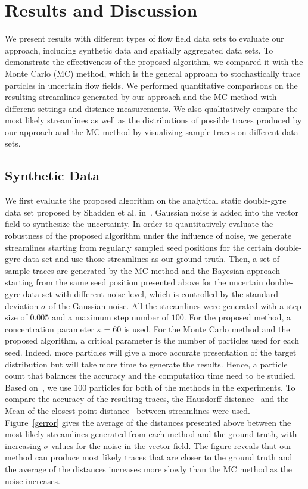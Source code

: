 \section{Results and Discussion}

We present results with different types of flow field data sets to evaluate our approach, including synthetic data and spatially aggregated data sets. To demonstrate the effectiveness of the proposed algorithm, we compared it with the Monte Carlo (MC) method, which is the general approach to stochastically trace particles in uncertain flow fields. We performed quantitative comparisons on the resulting streamlines generated by our approach and the MC method with different settings and distance measurements. We also qualitatively compare the most likely streamlines as well as the distributions of possible traces produced by our approach and the MC method by visualizing sample traces on different data sets.

\subsection{Synthetic Data}

We first evaluate the proposed algorithm on the analytical static double-gyre data set proposed by Shadden et al. in~\cite{Shadden2005271}. Gaussian noise is added into the vector field to synthesize the uncertainty. In order to quantitatively evaluate the robustness of the proposed algorithm under the influence of noise, we generate streamlines starting from regularly sampled seed positions for the certain double-gyre data set and use those streamlines as our ground truth. Then, a set of sample traces are generated by the MC method and the Bayesian approach starting from the same seed position presented above for the uncertain double-gyre data set with different noise level, which is controlled by the standard deviation $\sigma$ of the Gaussian noise. All the streamlines were generated with a step size of $0.005$ and a maximum step number of $100$. For the proposed method, a concentration parameter $\kappa = 60$ is used. For the Monte Carlo method and the proposed algorithm, a critical parameter is the number of particles used for each seed. Indeed, more particles will give a more accurate presentation of the target distribution but will take more time to generate the results. Hence, a particle count that balances the accuracy and the computation time need to be studied. Based on~\cite{journals/mia/PontabryROSKD13}, we use $100$ particles for both of the methods in the experiments. To compare the accuracy of the resulting traces, the Hausdorff distance~\cite{Roessl:2012:TVCG} and the Mean of the closest point distance~\cite{Corouge04towardsa} between streamlines were used. Figure~\ref{gerror} gives the average of the distances presented above between the most likely streamlines generated from each method and the ground truth, with increasing $\sigma$ values for the noise in the vector field. The figure reveals that our method can produce most likely traces that are closer to the ground truth and the average of the distances increases more slowly than the MC method as the noise increases.

